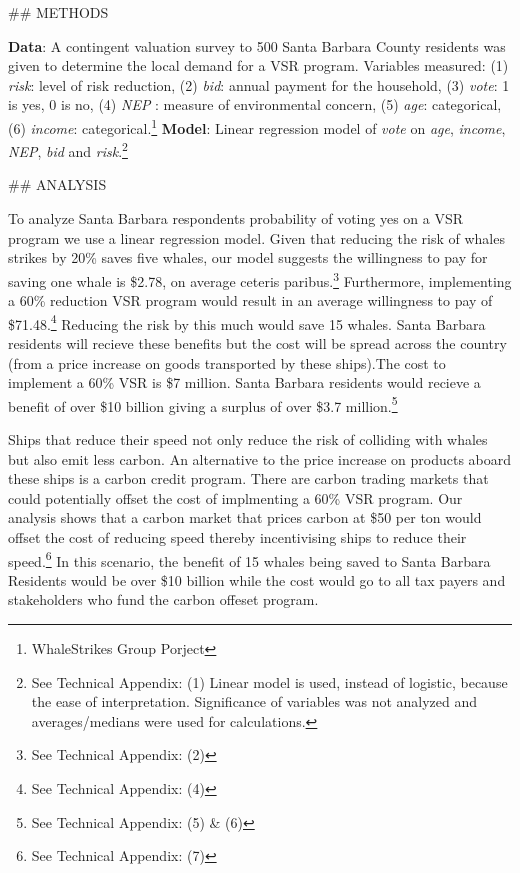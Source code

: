 \documentclass[10pt,]{article}
\let\rmarkdownfootnote\footnote%
\def\footnote{\protect\rmarkdownfootnote}
\begin{document}
\vspace{-15pt} \#\# METHODS \vspace{-10pt}

\textbf{Data}: A contingent valuation survey to 500 Santa Barbara County
residents was given to determine the local demand for a VSR program.
Variables measured: (1) \emph{risk}: level of risk reduction, (2)
\emph{bid}: annual payment for the household, (3) \emph{vote}: 1 is yes,
0 is no, (4) \emph{NEP} : measure of environmental concern, (5)
\emph{age}: categorical, (6) \emph{income}: categorical.\footnote{WhaleStrikes
  Group Porject} \textbf{Model}: Linear regression model of \emph{vote}
on \emph{age}, \emph{income}, \emph{NEP}, \emph{bid} and
\emph{risk}.\footnote{See Technical Appendix: (1) Linear model is used,
  instead of logistic, because the ease of interpretation. Significance
  of variables was not analyzed and averages/medians were used for
  calculations.}

\vspace{-15pt} \#\# ANALYSIS \vspace{-10pt}

To analyze Santa Barbara respondents probability of voting yes on a VSR
program we use a linear regression model. Given that reducing the risk
of whales strikes by 20\% saves five whales, our model suggests the
willingness to pay for saving one whale is \$2.78, on average ceteris
paribus.\footnote{See Technical Appendix: (2)} Furthermore, implementing
a 60\% reduction VSR program would result in an average willingness to
pay of \$71.48.\footnote{See Technical Appendix: (4)} Reducing the risk
by this much would save 15 whales. Santa Barbara residents will recieve
these benefits but the cost will be spread across the country (from a
price increase on goods transported by these ships).The cost to
implement a 60\% VSR is \$7 million. Santa Barbara residents would
recieve a benefit of over \$10 billion giving a surplus of over \$3.7
million.\footnote{See Technical Appendix: (5) \& (6)}

Ships that reduce their speed not only reduce the risk of colliding with
whales but also emit less carbon. An alternative to the price increase
on products aboard these ships is a carbon credit program. There are
carbon trading markets that could potentially offset the cost of
implmenting a 60\% VSR program. Our analysis shows that a carbon market
that prices carbon at \$50 per ton would offset the cost of reducing
speed thereby incentivising ships to reduce their speed.\footnote{See
  Technical Appendix: (7)} In this scenario, the benefit of 15 whales
being saved to Santa Barbara Residents would be over \$10 billion while
the cost would go to all tax payers and stakeholders who fund the carbon
offeset program.
\end{document}
